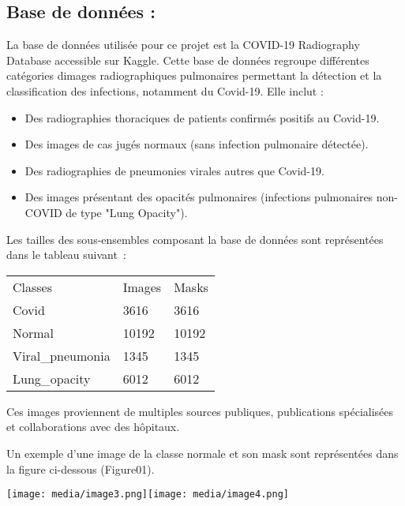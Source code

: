 \subsection[Base de données
:]{\texorpdfstring{\protect\hypertarget{anchor-6}{}{}\protect\hypertarget{anchor-7}{}{}\protect\hypertarget{anchor-8}{}{}Base
de données :}{Base de données :}}\label{base-de-donnuxe9es}

La base de données utilisée pour ce projet est la COVID-19 Radiography
Database accessible sur Kaggle. Cette base de données regroupe
différentes catégories d\textquotesingle images radiographiques
pulmonaires permettant la détection et la classification des infections,
notamment du Covid-19. Elle inclut :

\begin{itemize}
\tightlist
\item
  Des radiographies thoraciques de patients confirmés positifs au
  Covid-19.
\item
  Des images de cas jugés normaux (sans infection pulmonaire détectée).
\item
  Des radiographies de pneumonies virales autres que Covid-19.
\item
  Des images présentant des opacités pulmonaires (infections pulmonaires
  non-COVID de type "Lung Opacity").
\end{itemize}

Les tailles des sous-ensembles composant la base de données sont
représentées dans le tableau suivant~:

\begin{longtable}[]{@{}lll@{}}
\toprule\noalign{}
\endhead
\bottomrule\noalign{}
\endlastfoot
Classes & Images & Masks \\
Covid & 3616 & 3616 \\
Normal & 10192 & 10192 \\
Viral\_pneumonia & 1345 & 1345 \\
Lung\_opacity & 6012 & 6012 \\
\end{longtable}

Ces images proviennent de multiples sources publiques, publications
spécialisées et collaborations avec des hôpitaux.

Un exemple d'une image de la classe normale et son mask sont
représentées dans la figure ci-dessous (Figure01).

\texttt{[image: media/image3.png]}\texttt{[image: media/image4.png]}

